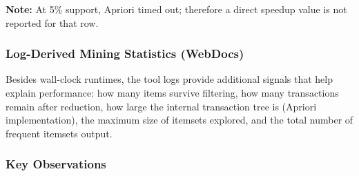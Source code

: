 \documentclass[11pt]{article}
\begin{document}
\noindent\textbf{Note:} At 5\% support, Apriori timed out; therefore a direct speedup value is not reported for that row.

\subsubsection{Log-Derived Mining Statistics (WebDocs)}

Besides wall-clock runtimes, the tool logs provide additional signals that help explain performance: how many items survive filtering, how many transactions remain after reduction, how large the internal transaction tree is (Apriori implementation), the maximum size of itemsets explored, and the total number of frequent itemsets output.

\begin{table}[H]
\centering
\small
\setlength{\tabcolsep}{3pt}
\renewcommand{\arraystretch}{1.15}
\caption{WebDocs: statistics extracted from tool logs (filtering, reduction, and output counts).}
\label{tab:webdocs_log_stats}
\end{table}

\subsubsection{Key Observations}
\end{document}
